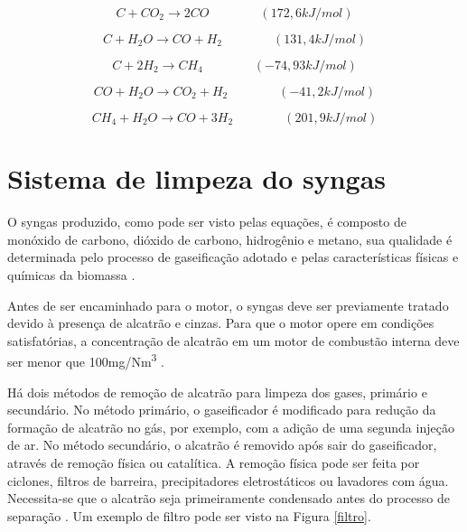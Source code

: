 \begin{equation} \label{eq:boudoard}
C + CO_2 \rightarrow 2CO	\qquad \qquad	(172,6 kJ/mol)
\end{equation}

\begin{equation} \label{eq:gas-agua}
C + H_2O \rightarrow CO + H_2 	\qquad \qquad	(131,4 kJ/mol)
\end{equation}

\begin{equation} \label{eq:metano}
C + 2H_2 \rightarrow CH_4 	\qquad \qquad	(-74,93 kJ/mol)
\end{equation}

\begin{equation} \label{eq:gas-gas_1}
CO + H_2O \rightarrow CO_2 + H_2	\qquad \qquad	(-41,2 kJ/mol)
\end{equation}

\begin{equation} \label{eq:gas-gas_2}
CH_4 + H_2O \rightarrow CO + 3H_2 	\qquad \qquad	(201,9 kJ/mol)
\end{equation}




\section{Sistema de limpeza do syngas}

O syngas produzido, como pode ser visto pelas equações, é composto de monóxido de carbono, dióxido de carbono, hidrogênio e metano, sua qualidade é determinada pelo processo de gaseificação adotado e pelas características físicas e químicas da biomassa \cite{chaves2016}.

Antes de ser encaminhado para o motor, o syngas deve ser previamente tratado devido à presença de alcatrão e cinzas. Para que o motor opere em condições satisfatórias, a concentração de alcatrão em um motor de combustão interna deve ser menor que 100mg/Nm\textsuperscript{3} \cite{hasler1999}. 

Há dois métodos de remoção de alcatrão para limpeza dos gases, primário e secundário. No método primário, o gaseificador é modificado para redução da formação de alcatrão no gás, por exemplo, com a adição de uma segunda injeção de ar. No método secundário, o alcatrão é removido após sair do gaseificador, através de remoção física ou catalítica. A remoção física pode ser feita por ciclones, filtros de barreira, precipitadores eletrostáticos ou lavadores com água. Necessita-se que o alcatrão seja primeiramente condensado antes do processo de separação \cite{basu2010}. Um exemplo de filtro pode ser visto na Figura \ref{filtro}.

